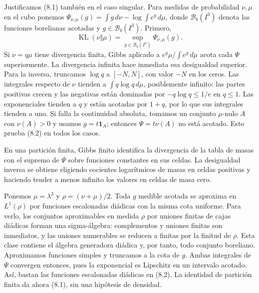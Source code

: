 \documentclass[spanish,11pt,a4paper]{article}
\begin{document}
Justificamos (8.1) también en el caso singular. Para medidas de probabilidad \(\nu,\mu\) en el cubo ponemos \(\Psi_{\nu,\mu}(g)=\int g\,d\nu-\log\int e^g\,d\mu\), donde \(\mathcal B_b(I^3)\) denota las funciones borelianas acotadas y \(g\in\mathcal B_b(I^3)\). Primero, \[\operatorname{KL}(\nu\Vert\mu)=\sup_{g\in\mathcal B_b(I^3)}\Psi_{\nu,\mu}(g).
\tag{8.2}\] Si \(\nu=q\mu\) tiene divergencia finita, Gibbs aplicado a \(e^g\mu/\int e^g\,d\mu\) acota cada \(\Psi\) superiormente. La divergencia infinita hace inmediata esa desigualdad superior. Para la inversa, truncamos \(\log q\) a \([-N,N]\), con valor \(-N\) en los ceros. Las integrales respecto de \(\nu\) tienden a \(\int q\log q\,d\mu\), posiblemente infinito: las partes positivas crecen y las negativas están dominadas por \(-q\log q\le1/e\) en \(q\le1\). Las exponenciales tienden a \(q\) y están acotadas por \(1+q\), por lo que sus integrales tienden a uno. Si falla la continuidad absoluta, tomamos un conjunto \(\mu\)-nulo \(A\) con \(\nu(A)>0\) y usamos \(g=t\mathbf1_A\); entonces \(\Psi=t\nu(A)\) no está acotado. Esto prueba (8.2) en todos los casos.

En una partición finita, Gibbs finito identifica la divergencia de la tabla de masas con el supremo de \(\Psi\) sobre funciones constantes en sus celdas. La desigualdad inversa se obtiene eligiendo cocientes logarítmicos de masas en celdas positivas y haciendo tender a menos infinito los valores en celdas de masa cero.

Ponemos \(\mu=\lambda^3\) y \(\rho=(\nu+\mu)/2\). Toda \(g\) medible acotada se aproxima en \(L^1(\rho)\) por funciones escalonadas diádicas con la misma cota uniforme. Para verlo, los conjuntos aproximables en medida \(\rho\) por uniones finitas de cajas diádicas forman una sigma-álgebra: complementos y uniones finitas son inmediatos, y las uniones numerables se reducen a finitas por la finitud de \(\rho\). Esta clase contiene el álgebra generadora diádica y, por tanto, todo conjunto boreliano. Aproximamos funciones simples y truncamos a la cota de \(g\). Ambas integrales de \(\Psi\) convergen entonces, pues la exponencial es Lipschitz en un intervalo acotado. Así, bastan las funciones escalonadas diádicas en (8.2). La identidad de partición finita da ahora (8.1), sin una hipótesis de densidad.
\end{document}
